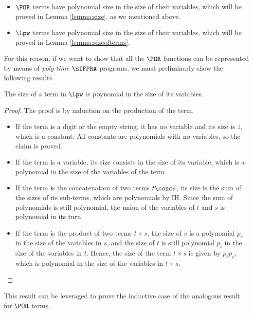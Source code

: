 \begin{itemize}
  \item $\POR$ terms have polynomial size in the size of their variables,
  which will be proved in Lemma \ref{lemma:size}, as we mentioned above.
  \item $\Lpw$ terms have polynomial size in the size of their variables,
  which will be proved in Lemma \ref{lemma:sizeofterms}.
\end{itemize}

For this reason, if we want to show that all the $\POR$
functions can be represented by means of \emph{poly-time} $\SIFPRA$ programs,
we must preliminarly show the following results.

\begin{lemma}\label{lemma:size}
The size of a term in $\Lpw$ is poynomial in the size
of its variables.
\end{lemma}
\begin{proof}
The proof is by induction on the production of the term.
\begin{itemize}
%
\item If the term is a digit or the empty string, it has no variable and its size is
$1$, which is a constant.
All constants are polynomials with no variables, so the claim is proved.
%
\item If the term is a variable, its size consists in the size of
its variable, which is a polynomial in the size of the variables of the term.
%
\item If the term is the concatenation
of two terms $t\conc s$, its size is the sum of the sizes of
its sub-terms, which are polynomials by IH.
Since the sum of polynomials is still polynomial, the union
of the variables of $t$ and $s$ is polynomial in its turn.
%
\item If the term is the product of two terms
$t\times s$, the size of $s$ is a polynomial $p_s$ in
the size of the variables in $s$, and the size of
$t$ is still polynomial $p_t$ in the size of
the variables in $t$.
Hence, the size of the term $t\times s$
is given by $p_tp_s$, which is polynomial
in the size of the variables in $t\times s$.
\end{itemize}
\end{proof}

This result can be leveraged to prove the inductive case of the analogous
result for $\POR$ terms.

